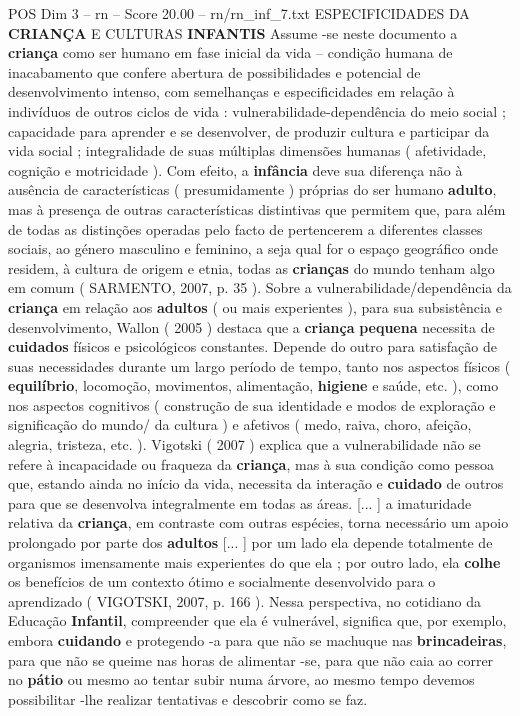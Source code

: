 \begin{textsample}{POS Dim 3 – rn – Score 20.00 – rn/rn\_inf\_7.txt}  \label{ex:f3_pos_096}
ESPECIFICIDADES DA \textbf{CRIANÇA} E CULTURAS \textbf{INFANTIS} Assume -se neste documento a \textbf{criança} como ser humano em fase inicial da vida – condição humana de inacabamento que confere abertura de possibilidades e potencial de desenvolvimento intenso, com semelhanças e especificidades em relação à indivíduos de outros ciclos de vida : vulnerabilidade-dependência do meio social ; capacidade para aprender e se desenvolver, de produzir cultura e participar da vida social ; integralidade de suas múltiplas dimensões humanas ( afetividade, cognição e motricidade ).
Com efeito, a \textbf{infância} deve sua diferença não à ausência de características ( presumidamente ) próprias do ser humano \textbf{adulto}, mas à presença de outras características distintivas que permitem que, para além de todas as distinções operadas pelo facto de pertencerem a diferentes classes sociais, ao género masculino e feminino, a seja qual for o espaço geográfico onde residem, à cultura de origem e etnia, todas as \textbf{crianças} do mundo tenham algo em comum ( SARMENTO, 2007, p. 35 ).
Sobre a vulnerabilidade/dependência da \textbf{criança} em relação aos \textbf{adultos} ( ou mais experientes ), para sua subsistência e desenvolvimento, Wallon ( 2005 ) destaca que a \textbf{criança} \textbf{pequena} necessita de \textbf{cuidados} físicos e psicológicos constantes.
Depende do outro para satisfação de suas necessidades durante um largo período de tempo, tanto nos aspectos físicos ( \textbf{equilíbrio}, locomoção, movimentos, alimentação, \textbf{higiene} e saúde, etc. ), como nos aspectos cognitivos ( construção de sua identidade e modos de exploração e significação do mundo/ da cultura ) e afetivos ( medo, raiva, choro, afeição, alegria, tristeza, etc. ).
Vigotski ( 2007 ) explica que a vulnerabilidade não se refere à incapacidade ou fraqueza da \textbf{criança}, mas à sua condição como pessoa que, estando ainda no início da vida, necessita da interação e \textbf{cuidado} de outros para que se desenvolva integralmente em todas as áreas. [... ] a imaturidade relativa da \textbf{criança}, em contraste com outras espécies, torna necessário um apoio prolongado por parte dos \textbf{adultos} [... ] por um lado ela depende totalmente de organismos imensamente mais experientes do que ela ; por outro lado, ela \textbf{colhe} os benefícios de um contexto ótimo e socialmente desenvolvido para o aprendizado ( VIGOTSKI, 2007, p. 166 ).
Nessa perspectiva, no cotidiano da Educação \textbf{Infantil}, compreender que ela é vulnerável, significa que, por exemplo, embora \textbf{cuidando} e protegendo -a para que não se machuque nas \textbf{brincadeiras}, para que não se queime nas horas de alimentar -se, para que não caia ao correr no \textbf{pátio} ou mesmo ao tentar subir numa árvore, ao mesmo tempo devemos possibilitar -lhe realizar tentativas e descobrir como se faz.

\end{textsample}
